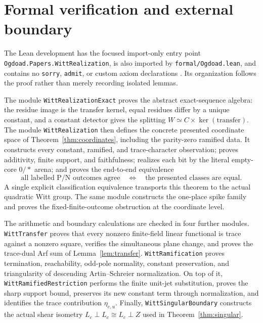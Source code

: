 \documentclass[11pt]{article}
\theoremstyle{definition}
\theoremstyle{remark}
\begin{document}
\section{Formal verification and external boundary}\label{sec:formal}

The Lean development has the focused import-only entry point
\texttt{Ogdoad.Papers.}\allowbreak\texttt{WittRealization}, is also imported by
\texttt{formal/Ogdoad.lean}, and contains
no \texttt{sorry}, \texttt{admit}, or custom axiom declarations
\cite{ogdoad2026}.  Its organization follows the proof rather than merely
recording isolated lemmas.

The module \texttt{WittRealizationExact} proves the abstract exact-sequence
algebra: the residue image is the transfer kernel, equal residues differ by a
unique constant, and a constant detector gives the splitting
$W\simeq C\times\ker(\mathrm{transfer})$.  The module
\texttt{WittRealization} then defines the concrete presented coordinate space
of Theorem~\ref{thm:coordinates}, including the parity-zero ramified data.  It
constructs every constant, ramified, and trace-character observation; proves
additivity, finite support, and faithfulness; realizes each bit by the literal
empty-core $0/*$ arena; and proves the end-to-end equivalence
\[
 \text{all labelled P/N outcomes agree}
 \quad\Longleftrightarrow\quad
 \text{the presented classes are equal}.
\]
A single explicit classification equivalence transports this theorem to the
actual quadratic Witt group.  The same module constructs the one-place spike
family and proves the fixed-finite-outcome obstruction at the coordinate
level.

The arithmetic and boundary calculations are checked in four further
modules.  \texttt{WittTransfer} proves that every nonzero finite-field linear
functional is trace against a nonzero square, verifies the simultaneous plane
change, and proves the trace-dual Arf sum of
Lemma~\ref{lem:transfer}.  \texttt{WittRamification} proves termination,
reachability, odd-pole normality, constant preservation, and triangularity of
descending Artin--Schreier normalization.  On top of it,
\texttt{WittRamifiedRestriction} performs the finite unit-jet substitution,
proves the sharp support bound, preserves its new constant term through
normalization, and identifies the trace contribution $\eta_{e,u}$.
Finally, \texttt{WittSingularBoundary} constructs the actual shear isometry
$L_c\perp L_c\cong L_c\perp Z$ used in
Theorem~\ref{thm:singular}.
\end{document}
